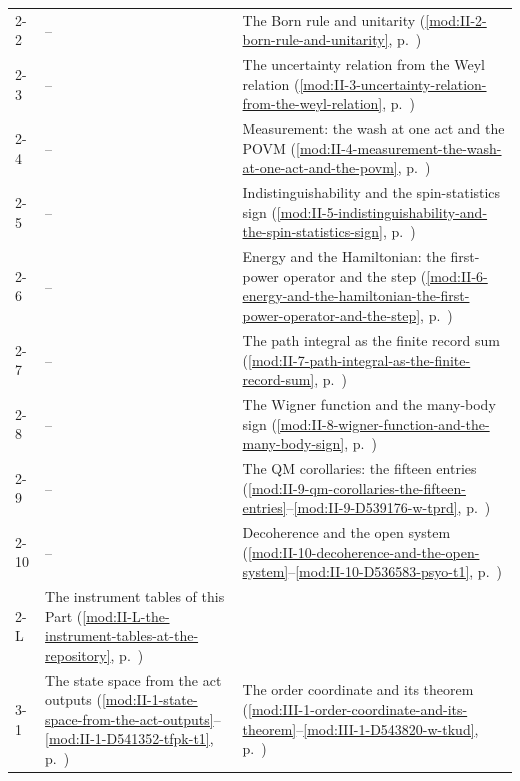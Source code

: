 {\begin{longtable}{p{11mm}p{70mm}p{60mm}}
2-2 & -- & The Born rule and unitarity (\ref{mod:II-2-born-rule-and-unitarity}, p.~\pageref{mod:II-2-born-rule-and-unitarity}) \\
2-3 & -- & The uncertainty relation from the Weyl relation (\ref{mod:II-3-uncertainty-relation-from-the-weyl-relation}, p.~\pageref{mod:II-3-uncertainty-relation-from-the-weyl-relation}) \\
2-4 & -- & Measurement: the wash at one act and the POVM (\ref{mod:II-4-measurement-the-wash-at-one-act-and-the-povm}, p.~\pageref{mod:II-4-measurement-the-wash-at-one-act-and-the-povm}) \\
2-5 & -- & Indistinguishability and the spin-statistics sign (\ref{mod:II-5-indistinguishability-and-the-spin-statistics-sign}, p.~\pageref{mod:II-5-indistinguishability-and-the-spin-statistics-sign}) \\
2-6 & -- & Energy and the Hamiltonian: the first-power operator and the step (\ref{mod:II-6-energy-and-the-hamiltonian-the-first-power-operator-and-the-step}, p.~\pageref{mod:II-6-energy-and-the-hamiltonian-the-first-power-operator-and-the-step}) \\
2-7 & -- & The path integral as the finite record sum (\ref{mod:II-7-path-integral-as-the-finite-record-sum}, p.~\pageref{mod:II-7-path-integral-as-the-finite-record-sum}) \\
2-8 & -- & The Wigner function and the many-body sign (\ref{mod:II-8-wigner-function-and-the-many-body-sign}, p.~\pageref{mod:II-8-wigner-function-and-the-many-body-sign}) \\
2-9 & -- & The QM corollaries: the fifteen entries (\ref{mod:II-9-qm-corollaries-the-fifteen-entries}--\ref{mod:II-9-D539176-w-tprd}, p.~\pageref{mod:II-9-qm-corollaries-the-fifteen-entries}) \\
2-10 & -- & Decoherence and the open system (\ref{mod:II-10-decoherence-and-the-open-system}--\ref{mod:II-10-D536583-psyo-t1}, p.~\pageref{mod:II-10-decoherence-and-the-open-system}) \\
2-L & The instrument tables of this Part (\ref{mod:II-L-the-instrument-tables-at-the-repository}, p.~\pageref{mod:II-L-the-instrument-tables-at-the-repository}) &  \\
3-1 & The state space from the act outputs (\ref{mod:II-1-state-space-from-the-act-outputs}--\ref{mod:II-1-D541352-tfpk-t1}, p.~\pageref{mod:II-1-state-space-from-the-act-outputs}) & The order coordinate and its theorem (\ref{mod:III-1-order-coordinate-and-its-theorem}--\ref{mod:III-1-D543820-w-tkud}, p.~\pageref{mod:III-1-order-coordinate-and-its-theorem}) \\

\end{longtable}}
